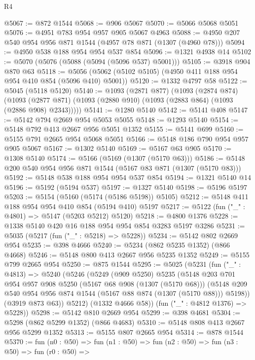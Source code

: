 \begin{lexlean}{R4}
\begin{coremodule}
@5067 := @872 @1544
@5068 := @906 @5067
@5070 := @5066 @5068 @5051
@5076 := @4951 @783 @954 @957 @905 @5067 @4963
@5088 := @4950 @207 @540 @954 @956 @871 @1544 (@4957 @78 @871 (@1307 (@4960 @78)))
@5094 := @4950 @538 @188 @954 @954 @537 @854
@5096 := @1321 @4938 @14
@5102 := @5070 (@5076 (@5088 (@5094 (@5096 @537) @5001)))
@5105 := @3918 @904 @870 @63
@5118 := @5056 (@5062 (@5102 @5105) (@4950 @411 @188 @954 @954 @410 @854 (@5096 @410) @5001))
@5120 := @1332 @4797 @58
@5122 := @5045 (@5118 @5120)
@5140 := @1093
    (@2871 @877)
    (@1093
      (@2874 @874)
      (@1093 (@2877 @871) (@1093 (@2880 @910) (@1093 (@2883 @864) (@1093 (@2886 @908) @2343)))))
@5141 := @1280 @5140
@5142 := @5141 @408
@5147 := @5142 @794 @2669 @954 @5053 @5055
@5148 := @1293 @5140
@5154 := @5148 @792 @413 @2667 @956 @5051 @1352
@5155 := @5141 @699
@5160 := @5155 @791 @2665 @954 @5068 @5051
@5166 := @5148 @186 @790 @954 @957 @905 @5067
@5167 := @1302 @5140
@5169 := @5167 @63 @905
@5170 := @1308 @5140
@5174 := @5166 (@5169 (@1307 (@5170 @63)))
@5186 := @5148 @200 @540 @954 @956 @871 @1544 (@5167 @83 @871 (@1307 (@5170 @83)))
@5192 := @5148 @538 @188 @954 @954 @537 @854
@5194 := @1321 @5140 @14
@5196 := @5192 (@5194 @537)
@5197 := @1327 @5140
@5198 := @5196 @5197
@5203 := @5154 (@5160 (@5174 (@5186 @5198)) @5105)
@5212 := @5148 @411 @188 @954 @954 @410 @854 (@5194 @410) @5197
@5217 := @5122 (fun ("_" : @4801) => @5147 (@5203 @5212) @5120)
@5218 := @4800 @1376
@5228 := @1338 @5140 @420 @16 @188 @954 @954 @854 @3283 @5197 @3286
@5231 := @5035 (@5217 (fun ("_" : @5218) => @5228))
@5234 := @5142 @802 @2669 @954
@5235 := @398 @4666
@5240 := @5234 (@862 @5235 @1352) (@866 @4668)
@5246 := @5148 @800 @413 @2667 @956 @5235 @1352
@5249 := @5155 @799 @2665 @954
@5250 := @875 @1544
@5295 := @5025
    (@5231
      (fun ("_" : @4813) =>
      @5240
        (@5246
          (@5249
            (@909 @5250)
            @5235
            (@5148
              @203
              @701
              @954
              @957
              @908
              @5250
              (@5167 @68 @908 (@1307 (@5170 @68)))
              (@5148 @209 @540 @954 @956 @874 @1544 (@5167 @88 @874 (@1307 (@5170 @88))) @5198))
            (@3919 @873 @63))
          @5212)
        (@1332 @4666 @58))
      (fun ("_" : @4812 @1376) => @5228))
@5298 := @5142 @810 @2669 @954
@5299 := @398 @4681
@5304 := @5298 (@862 @5299 @1352) (@866 @4683)
@5310 := @5148 @808 @413 @2667 @956 @5299 @1352
@5313 := @5155 @807 @2665 @954
@5314 := @878 @1544
@5370 := fun (n0 : @50) =>
  fun (n1 : @50) =>
  fun (n2 : @50) =>
  fun (n3 : @50) =>
  fun (r0 : @50) =>

\end{coremodule}
\end{lexlean}
